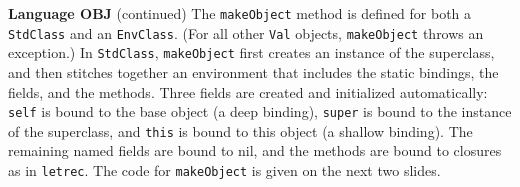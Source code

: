\begin{minipage}[t]{\sw}
\slidenumber
\LARGE
{\bf Language OBJ} (continued)\exx
The \verb'makeObject' method is defined
for both a \verb'StdClass' and an \verb'EnvClass'.
(For all other \verb'Val' objects,
\verb'makeObject' throws an exception.)\exx
In \verb'StdClass',
\verb'makeObject' first creates an instance of the superclass,
and then stitches together an environment
that includes the static bindings,
the fields, and the methods.
Three fields are created and initialized automatically:
\verb'self' is bound to the base object (a deep binding),
\verb'super' is bound to the instance of the superclass,
and \verb'this' is bound to this object (a shallow binding).
The remaining named fields are bound to nil,
and the methods are bound to closures as in \verb'letrec'.
The code for \verb'makeObject' is given on the next two slides.
\end{minipage}
